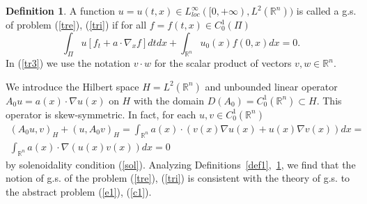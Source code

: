 \documentclass[12pt]{article}
\newcommand{\R}{{\mathbb R}}
\numberwithin{equation}{section}
\theoremstyle{plain}
\theoremstyle{definition}
\newtheorem{definition}{Definition}[section]
\begin{document}
\begin{definition}\label{def2}
A function $u=u(t,x)\in L^\infty_{loc}([0,+\infty),L^2(\R^n))$ is called a g.s. of problem (\ref{tre}), (\ref{tri}) if for all $f=f(t,x)\in C_0^1(\Pi)$
\begin{equation}\label{tr3}
\int_{\Pi} u[f_t+a\cdot\nabla_x f]dtdx+\int_{\R^n} u_0(x)f(0,x)dx=0.
\end{equation}
In (\ref{tr3}) we use the notation $v\cdot w$ for the scalar product of vectors $v,w\in\R^n$.
\end{definition}

We introduce the Hilbert space $H=L^2(\R^n)$ and unbounded linear operator $A_0u=a(x)\cdot\nabla u(x)$ on $H$ with the domain  $D(A_0)=C_0^1(\R^n)\subset H$. This operator is skew-symmetric. In fact, for each $u,v\in C_0^1(\R^n)$
\begin{align*}(A_0u,v)_H+(u,A_0v)_H=\int_{\R^n} a(x)\cdot(v(x)\nabla u(x)+u(x)\nabla v(x))dx= \\ \int_{\R^n} a(x)\cdot\nabla (u(x)v(x))dx=0
\end{align*}
by solenoidality condition (\ref{sol}). Analyzing Definitions~\ref{def1},~\ref{def2}, we find that the notion of g.s. of the problem (\ref{tre}), (\ref{tri}) is consistent with the theory of g.s. to the abstract problem (\ref{e1}), (\ref{c1}).
\end{document}
